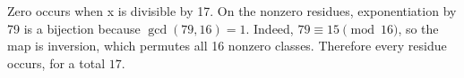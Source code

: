 Zero occurs when x is divisible by 17. On the nonzero residues, exponentiation by 79 is a bijection because $\gcd(79,16)=1$. Indeed, $79\equiv15\pmod{16}$, so the map is inversion, which permutes all 16 nonzero classes. Therefore every residue occurs, for a total $\boxed{17}$.
